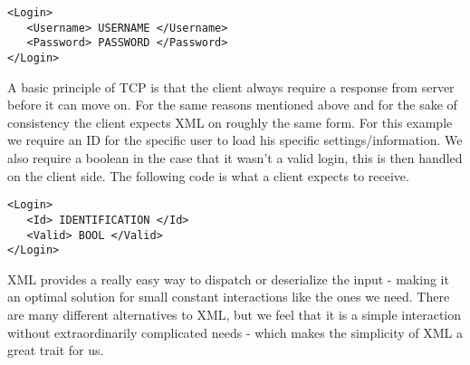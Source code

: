 \begin{lstlisting}
<Login>
   <Username> USERNAME </Username>
   <Password> PASSWORD </Password>
</Login>
\end{lstlisting}

A basic principle of TCP is that the client always require a response from server before it can move on. For the same reasons mentioned above and for the sake of consistency the client expects XML on roughly the same form. For this example we require an ID for the specific user to load his specific settings/information. We also require a boolean in the case that it wasn't a valid login, this is then handled on the client side. The following code is what a client expects to receive.

\begin{lstlisting}
<Login>
   <Id> IDENTIFICATION </Id>
   <Valid> BOOL </Valid>
</Login>
\end{lstlisting}

XML provides a really easy way to dispatch or deserialize the input - making it an optimal solution for small constant interactions like the ones we need. There are many different alternatives to XML, but we feel that it is a simple interaction without extraordinarily complicated needs - which makes the simplicity of XML a great trait for us.





